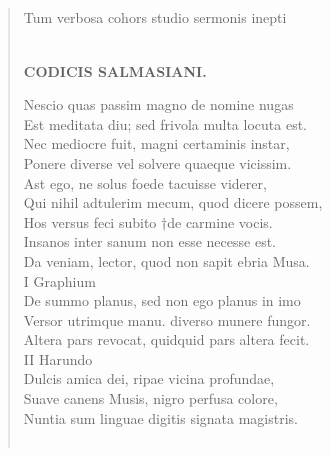 \documentclass[11pt, a4paper]{report}
\begin{document}
            \subsection*{}
      \begin{verse}
      Tum verbosa cohors studio sermonis inepti \\ 
        ﻿\pagebreak 
    \begin{center} \textbf{CODICIS SALMASIANI.} \end{center} \marginpar{[002]} Nescio quas passim magno de nomine nugas \\ Est meditata diu; sed frivola multa locuta est. \\ Nec mediocre fuit, magni certaminis instar, \\ Ponere diverse vel solvere quaeque vicissim. \\ Ast ego, ne solus foede tacuisse viderer, \\ Qui nihil adtulerim mecum, quod dicere possem, \\ Hos versus feci subito †de carmine vocis. \\ Insanos inter sanum non esse necesse est. \\ Da veniam, lector, quod non sapit ebria Musa. \\ I Graphium \\ De summo planus, sed non ego planus in imo \\ Versor utrimque manu. diverso munere fungor. \\ Altera pars revocat, quidquid pars altera fecit. \\ II Harundo \\ Dulcis amica dei, ripae vicina profundae, \\ Suave canens Musis, nigro perfusa colore, \\ Nuntia sum linguae digitis signata magistris. \\ 
        ﻿\pagebreak 

\end{verse}
\end{document}
